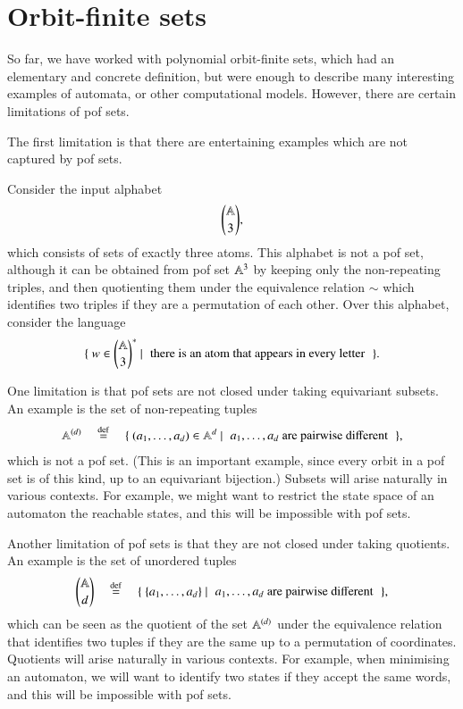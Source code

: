 \chapter{Orbit-finite sets}
\label{cha:orbit-finite-equality}

So far, we have worked with polynomial orbit-finite sets, which had an elementary and concrete definition, but were enough to describe many interesting examples of automata, or other computational models. However,  there are certain limitations of pof sets. 

The first limitation is that there are entertaining examples which are not captured by pof sets. 

\begin{myexample}
    Consider the input alphabet 
    \begin{align*}
    {\mathbb A\choose 3},
    \end{align*}
    which consists of sets of exactly three atoms. This alphabet is not a pof set, although it can be obtained from pof set $\mathbb A^3$ by keeping only the non-repeating triples, and then quotienting them under the equivalence relation $\sim$ which identifies two triples if they are a permutation of each other.
    Over this alphabet, consider the language 
    \begin{align*}
    \setbuild { w \in {\atoms \choose 3}^*}{there is an atom that appears in every letter}.
    \end{align*}
\end{myexample}

One limitation is that  pof sets are not closed under taking equivariant subsets. An example is the   set of non-repeating tuples
\begin{align*}
\atoms^{(d)} 
\quad \eqdef \quad 
\setbuild{(a_1,\ldots,a_d) \in \atoms^d}{$a_1,\ldots,a_d$ are pairwise different},
\end{align*}
which is not a pof set. (This is an important example, since every orbit in a pof set is of this kind, up to an equivariant bijection.) Subsets will arise naturally in various contexts. For example, we might want to restrict the state space of an automaton the reachable states, and this will be impossible with pof sets. 

Another limitation of pof sets is that they are not closed under taking quotients. An example is the set of unordered tuples 
\begin{align*}
{\atoms \choose d} 
\quad \eqdef \quad
\setbuild{\set{a_1,\ldots,a_d}}{$a_1,\ldots,a_d$ are pairwise different},
\end{align*}
which can be seen as the quotient of the set $\mathbb A^{(d)}$  under the equivalence relation that identifies two tuples if they are the same up to a permutation of coordinates. Quotients will arise naturally in various contexts. For example, when minimising an automaton, we will want to identify two states if they accept the same words, and this will be impossible with pof sets. 

